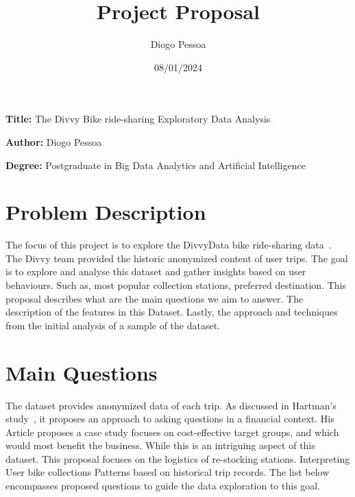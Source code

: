 \documentclass[12pt, a4paper]{article}
\title{Project Proposal}
\author{Diogo Pessoa}
\date{08/01/2024}
\newcommand{\namelistlabel}[1]{\mbox{#1}\hfil}
\newenvironment{namelist}[1]{%
    \begin{list}{}
    {
        \let\makelabel\namelistlabel
        \settowidth{\labelwidth}{#1}
        \setlength{\leftmargin}{1.1\labelwidth}
    }
    }{%
    \end{list}}
\begin{document}
    \maketitle
    \begin{namelist}{xxxxxxxxxxxx}
        \item[\textbf{Title:}]
        The Divvy Bike ride-sharing Exploratory Data Analysis
        \item[\textbf{Author:}]
        Diogo Pessoa
        \item[\textbf{Degree:}]
        Postgraduate in Big Data Analytics and Artificial Intelligence
    \end{namelist}

    \section*{Problem Description}
    \label{sec:ProblemDescription}
        The focus of this project is to explore the DivvyData bike ride-sharing data~\cite{DivvyData}.\newline
        The Divvy team provided the historic anonymized content of user trips.
        The goal is to explore and analyse this dataset and gather insights based on user behaviours.
        Such as, most popular collection stations, preferred destination.
        This proposal describes what are the main questions we aim to answer.
        The description of the features in this Dataset. Lastly, the approach and techniques from the initial analysis of a sample of the dataset.

      \section*{Main Questions}
      \label{sec:questions}

        The dataset provides anonymized data of each trip.\newline
        As discussed in Hartman's study~\cite{Hartman2021}, it proposes an approach to asking questions in a financial context.
        His Article proposes a case study focuses on cost-effective target groups, and which would most benefit the business.\newline
        While this is an intriguing aspect of this dataset.
        This proposal focuses on the logistics of re-stocking stations. Interpreting User bike collections Patterns based on historical trip records.
        The list below encompasses proposed questions to guide the data exploration to this goal.
\end{document}
